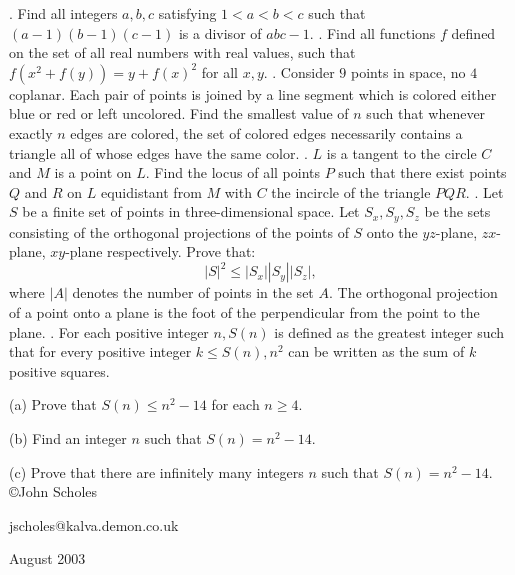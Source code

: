 \nopagenumbers
{}
\vskip 25pt
. Find all integers $a,b,c$ satisfying $1<a<b<c$ such that $(a-1)(b-1)(c-1)$ is a divisor of $abc-1$.
\vskip 12pt
. Find all functions $f$ defined on the set of all real numbers with real values, such that $f(x^2+f(y))=y+f(x)^2$ for all $x,y$.
\vskip 12pt
. Consider $9$ points in space, no $4$ coplanar. Each pair of points is joined by a line segment which is colored either blue or red or left uncolored. Find the smallest value of $n$ such that whenever exactly $n$ edges are colored, the set of colored edges necessarily contains a triangle all of whose edges have the same color.
\vskip 12pt
. $L$ is a tangent to the circle $C$ and $M$ is a point on $L$. Find the locus of all points $P$ such that there exist points $Q$ and $R$ on $L$ equidistant from $M$ with $C$ the incircle of the triangle $PQR$.
\vskip 12pt
. Let $S$ be a finite set of points in three-dimensional space. Let $S_x,S_y,S_z$ be the sets consisting of the orthogonal projections of the points of $S$ onto the $yz$-plane, $zx$-plane, $xy$-plane respectively. Prove that: $$|S|^2\le |S_x||S_y||S_z|,$$ where $|A|$ denotes the number of points in the set $A$. The orthogonal projection of a point onto a plane is the foot of the perpendicular from the point to the plane.
\vskip 12pt
. For each positive integer $n,S(n)$ is defined as the greatest integer such that for every positive integer $k\le S(n),n^2$ can be written as the sum of $k$ positive squares.

(a) Prove that $S(n)\le n^2-14$ for each $n\ge4$.

(b) Find an integer $n$ such that $S(n)=n^2-14$.

(c) Prove that there are infinitely many integers $n$ such that $S(n)=n^2-14$.
\vskip 20pt
\noindent \copyright John Scholes

\noindent jscholes@kalva.demon.co.uk

 August 2003

\bye
